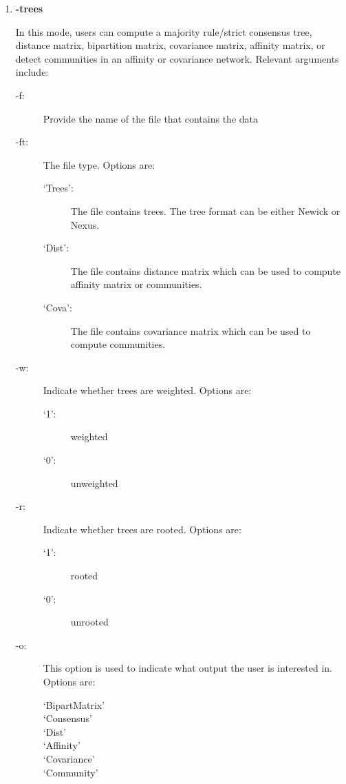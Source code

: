 \documentclass[11pt]{article}
\begin{document}
\begin{enumerate}[{\bf (1)}]
\item {\bf -trees} 

In this mode, users can compute a majority rule/strict consensus tree, distance matrix,
bipartition matrix, covariance matrix, affinity matrix, or detect communities in an affinity or
covariance network. Relevant arguments include:
	\begin{description}
	\item[-f:] Provide the name of the file that contains the data
	
	\item[-ft:] The file type. Options are:
		\begin{description}
		\item[`Trees':] The file contains trees. The tree format can be either Newick or Nexus.
		\item[`Dist':] The file contains distance matrix which can be used to compute affinity matrix or communities.
		\item[`Cova':] The file contains covariance matrix which can be used to compute communities.
		\end{description}
	
	\item[-w:] Indicate whether trees are weighted. Options are:
		\begin{description}
		\item[`1':] weighted
		\item[`0':] unweighted
		\end{description}
	
	\item[-r:] Indicate whether trees are rooted. Options are:
		\begin{description}
		\item[`1':] rooted
		\item[`0':] unrooted
		\end{description}
	
	\item[-o:] This option is used to indicate what output the user is interested in. Options are:
		\begin{description}
			\item[`BipartMatrix']
			\item[`Consensus']
			\item[`Dist']
			\item[`Affinity']
			\item[`Covariance']
			\item[`Community']
		\end{description}
	\end{description}


\end{enumerate}
\end{document}
